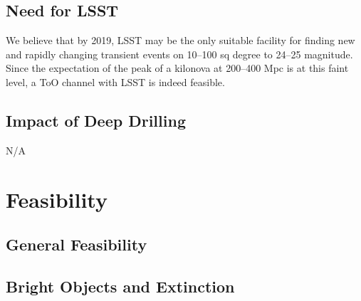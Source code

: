 \documentclass [11pt]{article}
\begin{document}

\subsection{Need for LSST}

%

We believe that by 2019, LSST may be the only suitable facility for finding new and rapidly changing transient events on 10--100 sq degree to 24--25 magnitude. Since the expectation of the peak of a kilonova at 200--400 Mpc is at this faint level, a ToO channel with LSST is indeed feasible.

\subsection{Impact of Deep Drilling}


N/A

\section{Feasibility}


\subsection{General Feasibility}

%


\subsection{Bright Objects and Extinction}
 
\end{document}
